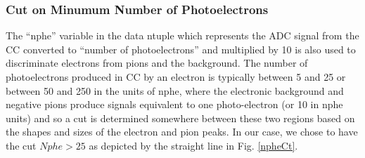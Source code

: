 \subsubsection{Cut on Minumum Number of Photoelectrons}
\label{nphCut} 
The ``nphe'' variable in the data ntuple which represents the ADC signal from the CC converted to ``number of photoelectrons'' and multiplied by 10 is also used %
to discriminate electrons from pions and %
the background. %
The number of photoelectrons produced in CC by an electron  is typically between 5 and 25 or between 50 and 250 in the units of nphe, where the electronic background and negative pions produce signals equivalent to one photo-electron (or 10 in nphe units) and so a cut is determined somewhere between these two regions based on the shapes and sizes of the electron and pion peaks. In our case, we chose to have the cut $Nphe > 25$ as depicted by the straight line in Fig. \ref{npheCt}.

